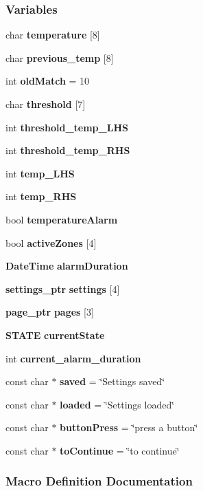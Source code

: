 \subsubsection*{Variables}
\begin{DoxyCompactItemize}
\item 
char \textbf{ temperature} [8]
\item 
char \textbf{ previous\+\_\+temp} [8]
\item 
int \textbf{ old\+Match} = 10
\item 
char \textbf{ threshold} [7]
\item 
int \textbf{ threshold\+\_\+temp\+\_\+\+L\+HS}
\item 
int \textbf{ threshold\+\_\+temp\+\_\+\+R\+HS}
\item 
int \textbf{ temp\+\_\+\+L\+HS}
\item 
int \textbf{ temp\+\_\+\+R\+HS}
\item 
bool \textbf{ temperature\+Alarm}
\item 
bool \textbf{ active\+Zones} [4]
\item 
\textbf{ Date\+Time} \textbf{ alarm\+Duration}
\item 
\textbf{ settings\+\_\+ptr} \textbf{ settings} [4]
\item 
\textbf{ page\+\_\+ptr} \textbf{ pages} [3]
\item 
\textbf{ S\+T\+A\+TE} \textbf{ current\+State}
\item 
int \textbf{ current\+\_\+alarm\+\_\+duration}
\item 
const char $\ast$ \textbf{ saved} = \char`\"{}Settings saved\char`\"{}
\item 
const char $\ast$ \textbf{ loaded} = \char`\"{}Settings loaded\char`\"{}
\item 
const char $\ast$ \textbf{ button\+Press} = \char`\"{}press a button\char`\"{}
\item 
const char $\ast$ \textbf{ to\+Continue} = \char`\"{}to continue\char`\"{}
\end{DoxyCompactItemize}


\subsubsection{Macro Definition Documentation}
\mbox{\label{a00038_a8a7e8976331b80fcd3334af0e72182a8}} 
